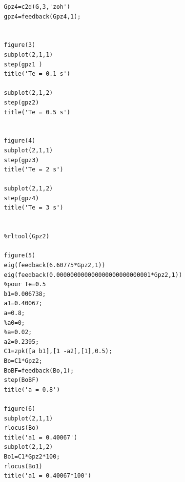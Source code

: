 \begin{appendices}
\begin{lstlisting}
Gpz4=c2d(G,3,'zoh')
gpz4=feedback(Gpz4,1);


figure(3)
subplot(2,1,1)
step(gpz1 )
title('Te = 0.1 s')

subplot(2,1,2)
step(gpz2)
title('Te = 0.5 s')


figure(4)
subplot(2,1,1)
step(gpz3)
title('Te = 2 s')

subplot(2,1,2)
step(gpz4)
title('Te = 3 s')


%rltool(Gpz2)

figure(5)
eig(feedback(6.60775*Gpz2,1))
eig(feedback(0.000000000000000000000000001*Gpz2,1))
%pour Te=0.5
b1=0.006738;
a1=0.40067;
a=0.8;
%a0=0;
%a=0.02;
a2=0.2395;
C1=zpk([a b1],[1 -a2],[1],0.5);
Bo=C1*Gpz2;
BoBF=feedback(Bo,1);
step(BoBF)
title('a = 0.8')

figure(6)
subplot(2,1,1)
rlocus(Bo)
title('a1 = 0.40067')
subplot(2,1,2)
Bo1=C1*Gpz2*100;
rlocus(Bo1)
title('a1 = 0.40067*100')
	
	\end{lstlisting}
	
\end{appendices}	